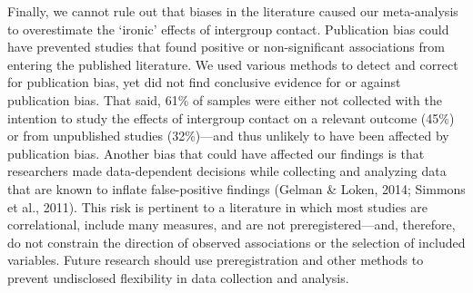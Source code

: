 \documentclass[12pt, letterpaper]{article}
\begin{document}
Finally, we cannot rule out that biases in the literature caused our
meta-analysis to overestimate the `ironic' effects of intergroup
contact. Publication bias could have prevented studies that found
positive or non-significant associations from entering the published
literature. We used various methods to detect and correct for
publication bias, yet did not find conclusive evidence for or against
publication bias. That said, 61\% of samples were either not collected
with the intention to study the effects of intergroup contact on a
relevant outcome (45\%) or from unpublished studies (32\%)---and thus
unlikely to have been affected by publication bias. Another bias that
could have affected our findings is that researchers made data-dependent
decisions while collecting and analyzing data that are known to inflate
false-positive findings (Gelman \& Loken, 2014; Simmons et al., 2011).
This risk is pertinent to a literature in which most studies are
correlational, include many measures, and are not preregistered---and,
therefore, do not constrain the direction of observed associations or
the selection of included variables. Future research should use
preregistration and other methods to prevent undisclosed flexibility in
data collection and analysis.
\end{document}
